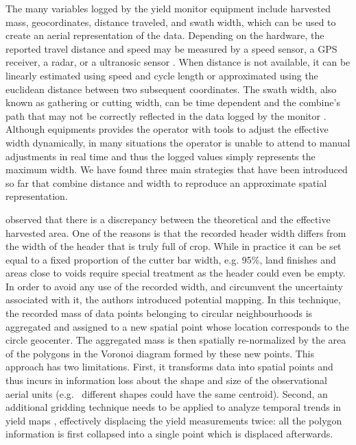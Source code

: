 The many variables logged by the yield monitor equipment include
harvested mass, geocordinates, distance traveled, and swath width,
which can be used to create an aerial representation of the
data. Depending on the hardware, the reported travel distance and
speed may be measured by a speed sensor, a GPS receiver, a radar, or a
ultranosic sensor \citep{Mulla2013}. When distance is not available,
it can be linearly estimated using speed and cycle length or
approximated using the euclidean distance between two subsequent
coordinates. The swath width, also known as gathering or cutting
width, can be time dependent and the combine's path that may not be
correctly reflected in the data logged by the monitor
\citep{Ross2008}. Although equipments provides the operator with tools
to adjust the effective width dynamically, in many situations the
operator is unable to attend to manual adjustments in real time and
thus the logged values simply represents the maximum width. We have
found three main strategies that have been introduced so far that
combine distance and width to reproduce an approximate spatial
representation.

\cite{Blackmore1999} observed that there is a discrepancy between the
theoretical and the effective harvested area. One of the reasons is
that the recorded header width differs from the width of the header
that is truly full of crop. While in practice it can be set equal to a
fixed proportion of the cutter bar width, e.g. 95\%, land finishes and
areas close to voids require special treatment as the header could
even be empty. In order to avoid any use of the recorded width, and
circumvent the uncertainty associated with it, the authors introduced
potential mapping. In this technique, the recorded mass of data points
belonging to circular neighbourhoods is aggregated and assigned to a
new spatial point whose location corresponds to the circle
geocenter. The aggregated mass is then spatially re-normalized by the
area of the polygons in the Voronoi diagram formed by these new
points. This approach has two limitations. First, it transforms data
into spatial points and thus incurs in information loss about the
shape and size of the observational aerial units (e.g. \ different
shapes could have the same centroid). Second, an additional gridding
technique needs to be applied to analyze temporal trends in yield maps
\citep{Blackmore2003}, effectively displacing the yield measurements
twice: all the polygon information is first collapsed into a single
point which is displaced afterwards.

